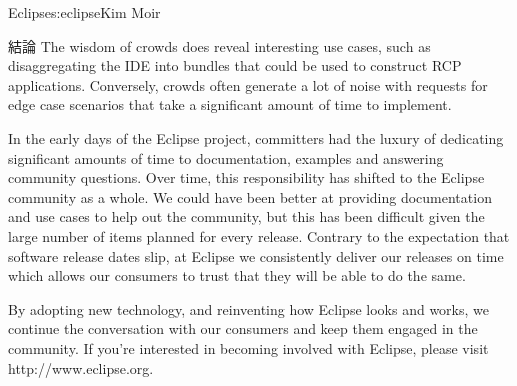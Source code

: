 \begin{aosachapter}{Eclipse}{s:eclipse}{Kim Moir}
\begin{aosasect1}{結論}
The wisdom of crowds does reveal interesting use cases, such as
disaggregating the IDE into bundles that could be used to construct
RCP applications.  Conversely, crowds often generate a lot of noise
with requests for edge case scenarios that take a significant amount
of time to implement.

In the early days of the Eclipse project, committers had the luxury of
dedicating significant amounts of time to documentation, examples and
answering community questions. Over time, this responsibility has
shifted to the Eclipse community as a whole.  We could have been
better at providing documentation and use cases to help out the
community, but this has been difficult given the large number of items
planned for every release.  Contrary to the expectation that software
release dates slip, at Eclipse we consistently deliver our releases on
time which allows our consumers to trust that they will be able to do
the same.

By adopting new technology, and reinventing how Eclipse looks and
works, we continue the conversation with our consumers and keep
them engaged in the community. If you're interested in becoming
involved with Eclipse, please visit http://www.eclipse.org.
\end{aosasect1}

\end{aosachapter}
